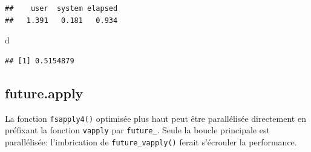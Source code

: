 \documentclass[
  12pt,
  french,
  a4paper,
  extrafontsizes,onecolumn,openright
  ]{memoir}
\newenvironment{Shaded}{\begin{snugshade}}{\end{snugshade}}
\newcommand{\NormalTok}[1]{#1}
\newlength{\rf}
\begin{document}
\begin{verbatim}
##    user  system elapsed 
##   1.391   0.181   0.934
\end{verbatim}

\begin{Shaded}
\begin{Highlighting}[]
\NormalTok{d}
\end{Highlighting}
\end{Shaded}

\begin{verbatim}
## [1] 0.5154879
\end{verbatim}

\normalsize

\subsection{future.apply}\label{future.apply}

La fonction \texttt{fsapply4()} optimisée plus haut peut être parallélisée directement en préfixant la fonction \texttt{vapply} par \texttt{future\_}.
Seule la boucle principale est parallélisée: l'imbrication de \texttt{future\_vapply()} ferait s'écrouler la performance.

\scriptsize
\end{document}
